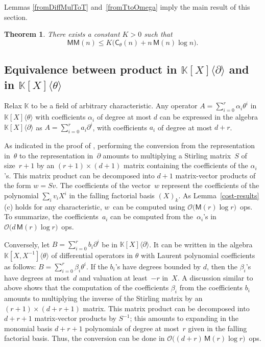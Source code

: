 \documentclass{sig-alt-full}
\newcommand{\x}{X}
\newcommand{\Tx}{\theta}
\newcommand{\Dx}{\partial}
\newcommand{\bigO}{{\mathcal{O}}}
\newcommand{\MM}{\mathsf{MM}}
\newcommand{\sC}{\mathsf{C}}
\newcommand{\sM}{\mathsf{M}}
\newcommand{\bK}{\mathbb{K}}
\newtheorem{theorem}{Theorem}
\begin{document}
Lemmas \ref{fromDiffMulToT} and~\ref{fromTtoOmega} imply the main result of this section.
\begin{theorem}
There exists a constant $K>0$ such that
\[\MM(n) \leq K\bigl( \sC_\Tx(n) +   n\,\sM(n) \log n\bigr).\]
\end{theorem}

\subsection{Equivalence between product in $ \bK[\x]\langle \Dx  \rangle$ and in $ \bK[\x]\langle \Tx  \rangle$}
\label{EquivDandTheta}

Relax $\bK$ to be a field of arbitrary characteristic. 
Any operator $A=\sum_{i=0}^r \alpha_i \Tx^i$ in $ \bK[\x]\langle \Tx \rangle$ with coefficients $\alpha_i$ of degree at most $d$ can be expressed in the algebra $ \bK[\x]\langle \Dx \rangle$ as $A=\sum_{i=0}^r a_i \Dx^i$, with coefficients $a_i$ of degree at most $d+r$.


As indicated in the proof of \cite[Cor.~2]{BoSc05}, performing the conversion from the representation in~$\Tx$ to the representation in~$\Dx$ amounts to multiplying a Stirling matrix~$S$ of size~$r+1$ by an $(r+1) \times (d+1)$ matrix containing the coefficients of the $\alpha_i$'s.
This matrix product can be decomposed into $d+1$ matrix-vector products of the form $w=Sv$.
The coefficients of the vector~$w$ represent the coefficients of the polynomial $\sum_i v_i \x^i$ in the falling factorial basis $(\x)_k$.
As Lemma~\ref{cost-results}(c) holds for any characteristic, $w$~can be computed using $\bigO\bigl(\sM (r) \log r\bigr)$~ops.
To summarize, the coefficients~$a_i$ can be computed from the~$\alpha_i$'s in $\bigO\bigl(d \, \sM (r) \log r\bigr)$~ops.

Conversely, let $B= \sum_{i=0}^r b_i \Dx^i$ be  in $ \bK[\x]\langle \Dx \rangle$.
It can be written in the algebra $ \bK[\x,\x^{-1}]\langle \Tx  \rangle$ of differential operators in $\Tx$ with Laurent polynomial coefficients as follows: $B=\sum_{i=0}^r \beta_i \Tx^i$.
If the $b_i$'s have degrees bounded by $d$, then the $\beta_i$'s have degrees at most~$d$ and valuation at least~$-r$ in~$\x$.
A discussion similar to above shows that the computation of the coefficients $\beta_i$ from the coefficients $b_i$ amounts to multiplying the inverse of the Stirling matrix by an $(r+1) \times (d+r+1)$ matrix.
This matrix product can be decomposed into $d+r+1$ matrix-vector products by $S^{-1}$;
this amounts to expanding in the monomial basis  $d+r+1$ polynomials of  degree at most~$r$ given in the falling factorial basis.
Thus, the conversion can be done in $\bigO\bigl((d+r) \, \sM (r) \log r\bigr)$~ops.
\end{document}

